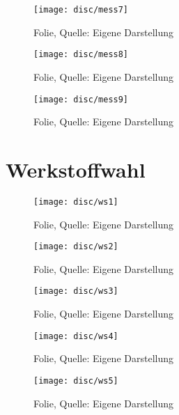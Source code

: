 \begin{figure}[H]
    \centering
    \texttt{[image: disc/mess7]}
    \caption[Folie]{Folie, Quelle: Eigene Darstellung}
    \label{fig:mess7}
\end{figure}

\begin{figure}[H]
    \centering
    \texttt{[image: disc/mess8]}
    \caption[Folie]{Folie, Quelle: Eigene Darstellung}
    \label{fig:mess8}
\end{figure}

\begin{figure}[H]
    \centering
    \texttt{[image: disc/mess9]}
    \caption[Folie]{Folie, Quelle: Eigene Darstellung}
    \label{fig:mess9}
\end{figure}

\thispagestyle{scrheadings}
\section{Werkstoffwahl}
\label{disc-mess}

\begin{figure}[H]
    \centering
    \texttt{[image: disc/ws1]}
    \caption[Folie]{Folie, Quelle: Eigene Darstellung}
    \label{fig:ws1}
\end{figure}

\begin{figure}[H]
    \centering
    \texttt{[image: disc/ws2]}
    \caption[Folie]{Folie, Quelle: Eigene Darstellung}
    \label{fig:ws2}
\end{figure}

\begin{figure}[H]
    \centering
    \texttt{[image: disc/ws3]}
    \caption[Folie]{Folie, Quelle: Eigene Darstellung}
    \label{fig:ws3}
\end{figure}

\begin{figure}[H]
    \centering
    \texttt{[image: disc/ws4]}
    \caption[Folie]{Folie, Quelle: Eigene Darstellung}
    \label{fig:ws4}
\end{figure}

\begin{figure}[H]
    \centering
    \texttt{[image: disc/ws5]}
    \caption[Folie]{Folie, Quelle: Eigene Darstellung}
    \label{fig:ws5}
\end{figure}

